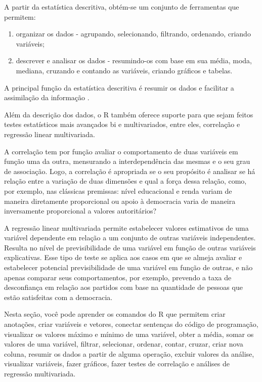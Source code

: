\documentclass[
  10pt,
  brazil,
  a4paper,
  twoside, notitlepage, openright]{book}
\providecommand{\tightlist}{%
  \setlength{\itemsep}{0pt}\setlength{\parskip}{0pt}}
\begin{document}
A partir da estatística descritiva, obtém-se um conjunto de ferramentas que permitem:

\begin{enumerate}
\def\labelenumi{\alph{enumi})}
\tightlist
\item
  organizar os dados - agrupando, selecionando, filtrando, ordenando, criando variáveis;
\item
  descrever e analisar os dados - resumindo-os com base em sua média, moda, mediana, cruzando e contando as variáveis, criando gráficos e tabelas.
\end{enumerate}

A principal função da estatística descritiva é resumir os dados e facilitar a assimilação da informação \citep{agresti_metodos_2012}.

Além da descrição dos dados, o R também oferece suporte para que sejam feitos testes estatísticos mais avançados bi e multivariados, entre eles, correlação e regressão linear multivariada.

A correlação tem por função avaliar o comportamento de duas variáveis em função uma da outra, mensurando a interdependência das mesmas e o seu grau de associação. Logo, a correlação é apropriada se o seu propósito é analisar se há relação entre a variação de duas dimensões e qual a força dessa relação, como, por exemplo, nas clássicas premissas: nível educacional e renda variam de maneira diretamente proporcional ou apoio à democracia varia de maneira inversamente proporcional a valores autoritários?

A regressão linear multivariada permite estabelecer valores estimativos de uma variável dependente em relação a um conjunto de outras variáveis independentes. Resulta no nível de previsibilidade de uma variável em função de outras variáveis explicativas. Esse tipo de teste se aplica aos casos em que se almeja avaliar e estabelecer potencial previsibilidade de uma variável em função de outras, e não apenas comparar seus comportamentos, por exemplo, prevendo a taxa de desconfiança em relação aos partidos com base na quantidade de pessoas que estão satisfeitas com a democracia.

Nesta seção, você pode aprender os comandos do R que permitem criar anotações, criar variáveis e vetores, conectar sentenças do código de programação, visualizar os valores máximo e mínimo de uma variável, obter a média, somar os valores de uma variável, filtrar, selecionar, ordenar, contar, cruzar, criar nova coluna, resumir os dados a partir de alguma operação, excluir valores da análise, visualizar variáveis, fazer gráficos, fazer testes de correlação e análises de regressão multivariada.
\end{document}
